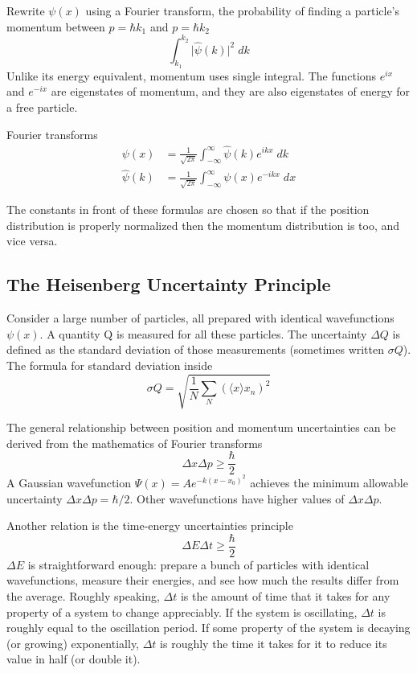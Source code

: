 \documentclass[../../../main.tex]{subfiles}
\begin{document}
Rewrite $\psi(x)$ using a Fourier transform, the probability of finding a particle's momentum between $p = \hbar k_1$ and $p = \hbar k_2$
\begin{equation*}
    \int_{k_1}^{k_2} \big| \hat{\psi}(k) \Big|^2\;dk
\end{equation*}
Unlike its energy equivalent, momentum uses single integral. The functions $e^{ix}$ and $e^{-ix}$ are eigenstates of momentum, and they are also eigenstates of energy for a free particle. 

Fourier transforms
\begin{align*}
    \psi(x)&= \frac{1}{\sqrt{2\pi}} \int_{-\infty}^{\infty}\hat{\psi}(k) e^{ikx}\;dk\\
    \hat{\psi}(k)&= \frac{1}{\sqrt{2\pi}} \int_{-\infty}^{\infty}\psi(x) e^{-ikx}\;dx
\end{align*}

The constants in front of these formulas are chosen so that if the position distribution is properly normalized then the momentum distribution is too, and vice versa.

\subsection{The Heisenberg Uncertainty Principle}
Consider a large number of particles, all prepared with identical wavefunctions $\psi (x)$. A quantity Q is measured for all these particles. The uncertainty $\Delta Q$ is defined as the standard deviation of those measurements (sometimes written $\sigma Q$). The formula for standard deviation inside
\begin{equation*}
    \sigma Q=\sqrt{\frac{1}{N}\sum_{N}^{}(\langle x\rangle x_n)^2}
\end{equation*}

The general relationship between position and momentum uncertainties can be derived from
the mathematics of Fourier transforms
\begin{equation*}
    \Delta x \Delta p \geq \frac{\hbar}{2}
\end{equation*}
A Gaussian wavefunction $\Psi (x) = A e^{-k(x-x_0)^2}$ achieves the minimum allowable uncertainty $\Delta x \Delta p = \hbar/2$. Other wavefunctions have higher values of $\Delta x \Delta p$.

Another relation is the time-energy uncertainties principle
\begin{equation*}
    \Delta E \Delta t \geq \frac{\hbar}{2}
\end{equation*}
$\Delta E$ is straightforward enough: prepare a bunch of particles with identical wavefunctions, measure their energies, and see how much the results differ from the average. Roughly speaking, $\Delta t$ is the amount of time that it takes for any property of a system to change appreciably. If the system is oscillating, $\Delta t$ is roughly equal to the oscillation period. If some property of the system is decaying (or growing) exponentially, $\Delta t$ is roughly the time it takes for it to reduce its value in half (or double it).
\end{document}
